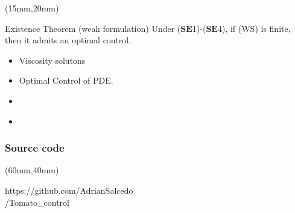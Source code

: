 \begin{frame}[plain]
	
	\begin{textblock*}{100mm}(15mm,20mm)
		\begin{graybox}{Existence Theorem (weak formulation)}
			Under ($\mathbf{SE}$1)-($\mathbf{SE}$4), if (WS) is finite, then it admits an optimal control.
		\end{graybox}
	\end{textblock*}

\end{frame}
\begin{frame}[plain]
	\begin{itemize}
		\item<1-> Viscosity solutons
		\item<2-> Optimal Control of PDE.
	\end{itemize}
	\begin{itemize}
		\item<1-> 	\begin{bibunit}[abbrv]
						\nocite{Wendell2006}
						\putbib
					\end{bibunit}
		\item<2->	\begin{bibunit}[abbrv]
						\nocite{Fredi2010}
						\putbib
					\end{bibunit}
	\end{itemize}
\end{frame}

\begin{frame}[plain]\frametitle{Source code}
	\begin{textblock*}{60mm}(60mm,40mm)
		\begin{yellowbox}{}
			https://github.com/AdrianSalcedo\\/Tomato\_control
		\end{yellowbox}
	\end{textblock*}
\end{frame}

